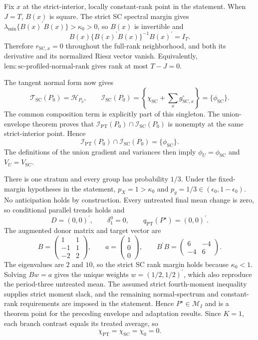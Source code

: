 Fix \(x\) at the strict-interior, locally constant-rank point in the statement.  When \(J=T\), \(B(x)\) is square.  The strict SC spectral margin gives \(\lambda_{\min}\{B(x)^{\prime}B(x)\}>\kappa_0>0\), so \(B(x)\) is invertible and
\[
 B(x)\{B(x)^{\prime}B(x)\}^{-1}B(x)^{\prime}=I_T.
 \tag{1}
\]
Therefore \(r_{\mathrm{SC},x}=0\) throughout the full-rank neighborhood, and both its derivative and its normalized Riesz vector vanish.  Equivalently, \(\mathrm{lem{:}sc\text{-}profiled\text{-}normal\text{-}rank}\) gives rank at most \(T-J=0\).

The tangent normal form now gives
\[
 \mathcal T_{\mathrm{SC}}(P_0)=\mathcal H_{P_0},
 \qquad
 \mathcal I_{\mathrm{SC}}(P_0)
 =\left\{\chi_{\mathrm{SC}}+\sum_xg^{\circ}_{\mathrm{SC},x}\right\}
 =\{\phi_{\mathrm{SC}}\}.
 \tag{2}
\]
The common composition term is explicitly part of this singleton.  The union-envelope theorem proves that \(\mathcal I_{\mathrm{PT}}(P_0)\cap\mathcal I_{\mathrm{SC}}(P_0)\) is nonempty at the same strict-interior point.  Hence
\[
 \mathcal I_{\mathrm{PT}}(P_0)\cap\mathcal I_{\mathrm{SC}}(P_0)
 =\{\phi_{\mathrm{SC}}\}.
 \tag{3}
\]
The definitions of the union gradient and variances then imply \(\phi_U=\phi_{\mathrm{SC}}\) and \(V_U=V_{\mathrm{SC}}\).

There is one stratum and every group has probability \(1/3\).  Under the fixed-margin hypotheses in the statement, \(p_X=1>\kappa_0\) and \(p_g=1/3\in(\epsilon_0,1-\epsilon_0)\).  No anticipation holds by construction.  Every untreated final mean change is zero, so conditional parallel trends holds and
\[
 D=(0,0)^{\prime},
 \qquad
 \delta_1^0=0,
 \qquad
 q_{\mathrm{PT}}(P^{\star})=(0,0)^{\prime}.
 \tag{1}
\]
The augmented donor matrix and target vector are
\[
 B=\begin{pmatrix}1&1\\-1&1\\-2&2\end{pmatrix},
 \qquad
 a=\begin{pmatrix}1\\0\\0\end{pmatrix},
 \qquad
 B^{\prime}B=\begin{pmatrix}6&-4\\-4&6\end{pmatrix}.
 \tag{2}
\]
The eigenvalues are \(2\) and \(10\), so the strict SC rank margin holds because \(\kappa_0<1\).  Solving \(Bw=a\) gives the unique weights \(w=(1/2,1/2)^{\prime}\), which also reproduce the period-three untreated mean.  The assumed strict fourth-moment inequality supplies strict moment slack, and the remaining normal-spectrum and constant-rank requirements are imposed in the statement.  Hence \(P^{\star}\in\mathcal M_I\) and is a theorem point for the preceding envelope and adaptation results.  Since \(K=1\), each branch contrast equals its treated average, so
\[
 \chi_{\mathrm{PT}}=\chi_{\mathrm{SC}}=\chi_0=0.
 \tag{3}
\]

